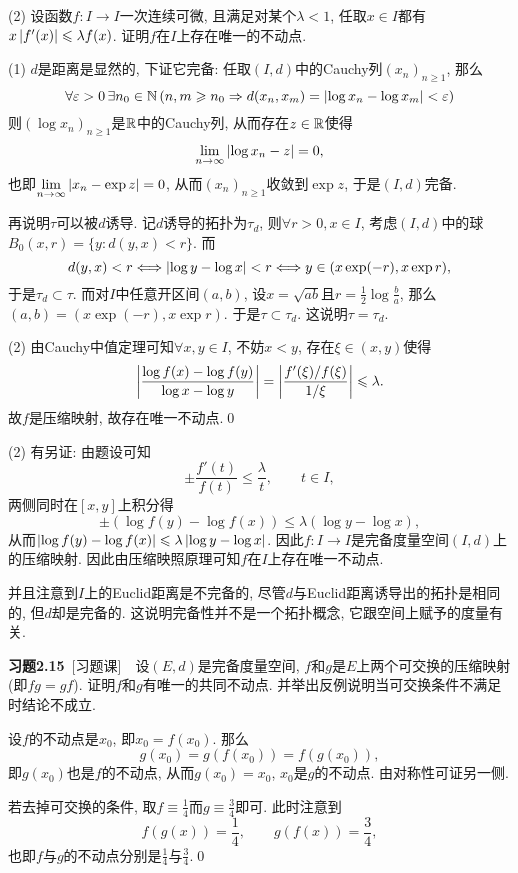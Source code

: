     (2) 设函数$ f : I\to I $一次连续可微, 且满足对某个$ \lambda<1 $, 任取$ x\in I $都有$ x\left| f'(x) \right| \leqslant\lambda f(x) $. 证明$ f $在$ I $上存在唯一的不动点.
    \begin{Proof}
    (1) $ d $是距离是显然的, 下证它完备: 任取$ (I,d) $中的Cauchy列$ (x_n)_{n\geqslant 1} $, 那么
    \[
    \forall\varepsilon>0\,\exists n_0\in\mathbb{N}\,(n,m\geqslant n_0\Rightarrow d(x_n,x_m)=\left| \log{x_n}-\log{x_m} \right| <\varepsilon)
    \]
    则$ (\log x_n)_{n\geqslant 1} $是$ \mathbb{R} $中的Cauchy列, 从而存在$ z\in\mathbb{R} $使得
    \[
    \lim_{n\to\infty}\left| \log x_n-z \right| =0,
    \]
    也即$ \lim\limits_{n\to\infty}\left| x_n-\exp z \right| =0 $, 从而$ (x_n)_{n\geqslant 1} $收敛到$ \exp z $, 于是$ (I,d) $完备.
    
    再说明$ \tau $可以被$ d $诱导. 记$ d $诱导的拓扑为$ \tau_d $, 则$ \forall r>0,x\in I $, 考虑$ (I,d) $中的球$ B_0(x,r)=\{ y : d(y,x)<r \} $. 而
    \[
    d(y,x)<r\Longleftrightarrow\left| \log y-\log x \right| <r\Longleftrightarrow y\in(x\exp (-r),x\exp r),
    \]
    于是$ \tau_d\subset \tau $. 而对$ I $中任意开区间$ (a,b) $, 设$ x=\sqrt{ab} $且$ r=\frac{1}{2}\log\frac{b}{a} $, 那么$ (a,b)=(x\exp(-r),x\exp r) $. 于是$ \tau\subset\tau_d $. 这说明$ \tau=\tau_d $.
    
    (2) 由Cauchy中值定理可知$ \forall x,y\in I $, 不妨$ x<y $, 存在$ \xi\in(x,y) $使得
    \[
    \left| \frac{\log f(x)-\log f(y)}{\log x-\log y} \right| =\left| \frac{f'(\xi)/f(\xi)}{1/\xi} \right| \leqslant\lambda.
    \]
    故$ f $是压缩映射, 故存在唯一不动点.\qed
    \end{Proof}
    \begin{Remark}
    (2) 有另证: 由题设可知
    \[
    \pm\frac{f'(t)}{f(t)}\leqslant\frac{\lambda}{t},\qquad t\in I,
    \]
    两侧同时在$ [x,y] $上积分得
    \[
    \pm(\log f(y)-\log f(x))\leqslant\lambda(\log y-\log x),
    \]
    从而$ \left| \log f(y)-\log f(x) \right| \leqslant\lambda\left| \log y-\log x \right|  $. 因此$ f : I\to I $是完备度量空间$ (I,d) $上的压缩映射. 因此由压缩映照原理可知$ f $在$ I $上存在唯一不动点.
    
    并且注意到$ I $上的Euclid距离是不完备的, 尽管$ d $与Euclid距离诱导出的拓扑是相同的, 但$ d $却是完备的. 这说明完备性并不是一个拓扑概念, 它跟空间上赋予的度量有关.
    \end{Remark}
    
    \textbf{习题2.15}\ [习题课]\ \ 设$ (E,d) $是完备度量空间, $ f $和$ g $是$ E $上两个可交换的压缩映射(即$ fg=gf $). 证明$ f $和$ g $有唯一的共同不动点. 并举出反例说明当可交换条件不满足时结论不成立.
    \begin{Proof}
    设$ f $的不动点是$ x_0 $, 即$ x_0=f(x_0) $. 那么
    \[
    g(x_0)=g(f(x_0))=f(g(x_0)),
    \]
    即$ g(x_0) $也是$ f $的不动点, 从而$ g(x_0)=x_0 $, $ x_0 $是$ g $的不动点. 由对称性可证另一侧.
    
    若去掉可交换的条件, 取$ f\equiv\frac{1}{4} $而$ g\equiv\frac{3}{4} $即可. 此时注意到
    \[
    f(g(x))=\frac{1}{4},\qquad g(f(x))=\frac{3}{4},
    \]
    也即$ f $与$ g $的不动点分别是$ \frac{1}{4} $与$ \frac{3}{4} $.\qed
    \end{Proof}
    
